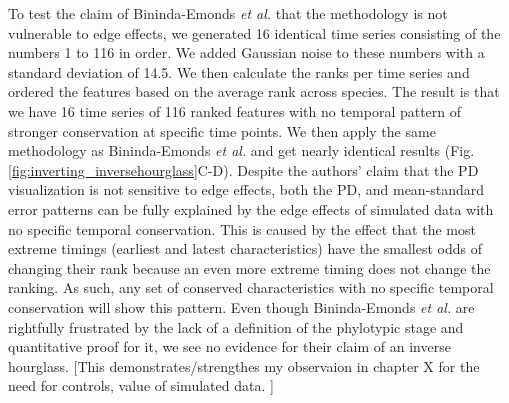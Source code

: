 To test the claim of Bininda-Emonds \textit{et al.} that the methodology is not vulnerable to edge effects, we generated 16 identical time series consisting of the numbers 1 to 116 in order. We added Gaussian noise to these numbers with a standard deviation of 14.5. We then calculate the ranks per time series and ordered the features based on the average rank across species. The result is that we have 16 time series of 116 ranked features with no temporal pattern of stronger conservation at specific time points. We then apply the same methodology as Bininda-Emonds \textit{et al.} and get nearly identical results (Fig. \ref{fig:inverting_inversehourglass}C-D). Despite the authors' claim that the PD visualization is not sensitive to edge effects, both the PD, and mean-standard error patterns can be fully explained by the edge effects of simulated data with no specific temporal conservation. This is caused by the effect that the most extreme timings (earliest and latest characteristics) have the smallest odds of changing their rank because an even more extreme timing does not change the ranking. As such, any set of conserved characteristics with no specific temporal conservation will show this pattern. Even though Bininda-Emonds \textit{et al.} are rightfully frustrated by the lack of a definition of the phylotypic stage and quantitative proof for it, we see no evidence for their claim of an inverse hourglass. [This demonstrates/strengthes my observaion in chapter X for the need for controls, value of simulated data. ]

\newpage

\vspace*{\fill}

